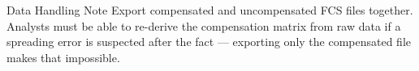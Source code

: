 \vspace{6pt}
\begin{infobox}{Data Handling Note}
Export compensated and uncompensated FCS files together. Analysts must be
able to re-derive the compensation matrix from raw data if a spreading error
is suspected after the fact --- exporting only the compensated file makes
that impossible.
\end{infobox}
